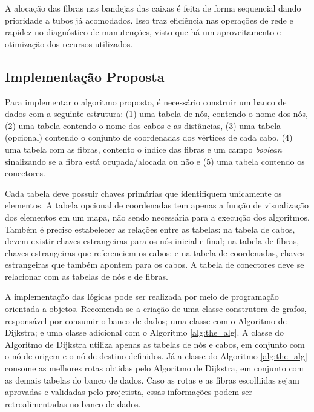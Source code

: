 A alocação das fibras nas bandejas das caixas é feita de forma sequencial 
dando prioridade a tubos já acomodados. Isso traz eficiência nas operações de
rede e rapidez no diagnóstico de manutenções, visto que há um aproveitamento e
otimização dos recursos utilizados.

\subsection{Implementação Proposta}

Para implementar o algoritmo proposto, é necessário construir um banco de dados
com a seguinte estrutura: (1) uma tabela de nós, contendo o nome dos nós, (2)
uma tabela contendo o nome dos cabos e as distâncias, (3) uma tabela (opcional)
contendo o conjunto de coordenadas dos vértices de cada cabo, (4) uma tabela
com as fibras, contento o índice das fibras e um campo \textit{boolean}
sinalizando se a fibra está ocupada/alocada ou não e (5) uma tabela contendo os
conectores.

Cada tabela deve possuir chaves primárias que identifiquem unicamente os
elementos. A tabela opcional de coordenadas tem apenas a função de visualização
dos elementos em um mapa, não sendo necessária para a execução dos algoritmos.
Também é preciso estabelecer as relações entre as tabelas: na tabela de cabos,
devem existir chaves estrangeiras para os nós inicial e final; na tabela de
fibras, chaves estrangeiras que referenciem os cabos; e na tabela de
coordenadas, chaves estrangeiras que também apontem para os cabos. A tabela de
conectores deve se relacionar com as tabelas de nós e de fibras.

A implementação das lógicas pode ser realizada por meio de programação
orientada a objetos. Recomenda-se a criação de uma classe construtora de
grafos, responsável por consumir o banco de dados; uma classe com o Algoritmo
de Dijkstra; e uma classe adicional com o Algoritmo \ref{alg:the_alg}. A classe
do Algoritmo de Dijkstra utiliza apenas as tabelas de nós e cabos, em conjunto
com o nó de origem e o nó de destino definidos. Já a classe do Algoritmo
\ref{alg:the_alg} consome as melhores rotas obtidas pelo Algoritmo de Dijkstra,
em conjunto com as demais tabelas do banco de dados. Caso as rotas e as fibras
escolhidas sejam aprovadas e validadas pelo projetista, essas informações podem
ser retroalimentadas no banco de dados.

